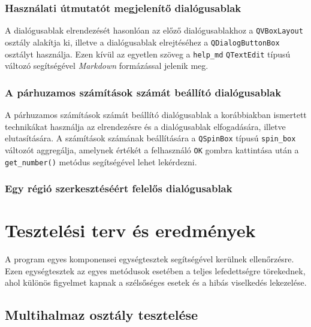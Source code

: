 \subsubsection{Használati útmutatót megjelenítő dialógusablak}

A dialógusablak elrendezését hasonlóan az előző dialógusablakhoz a \verb|QVBoxLayout| osztály alakítja ki, illetve a dialógusablak elrejtéséhez a \verb|QDialogButtonBox| osztályt használja. Ezen kívül az egyetlen szöveg a \verb|help_md| \verb|QTextEdit| típusú változó segítségével \textit{Markdown} formázással jelenik meg.

\subsubsection{A párhuzamos számítások számát beállító dialógusablak}

A párhuzamos számítások számát beállító dialógusablak a korábbiakban ismertett technikákat használja az elrendezésre és a dialógusablak elfogadására, illetve elutasítására. A számítások számának beállítására a \verb|QSpinBox| típusú \verb|spin_box| változót aggregálja, amelynek értékét a felhasználó \verb|OK| gombra kattintása után a \verb|get_number()| metódus segítségével lehet lekérdezni.

\subsubsection{Egy régió szerkesztéséért felelős dialógusablak} 

\section{Tesztelési terv és eredmények}

A program egyes komponensei egységtesztek segítségével kerülnek ellenőrzésre. Ezen egységtesztek az egyes metódusok esetében a teljes lefedettségre törekednek, ahol különös figyelmet kapnak a szélsőséges esetek és a hibás viselkedés lekezelése.

\subsection{Multihalmaz osztály tesztelése}

